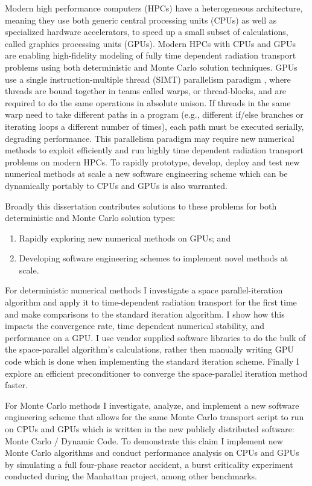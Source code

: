Modern high performance computers (HPCs) have a heterogeneous architecture, meaning they use both generic central processing units (CPUs) as well as specialized hardware accelerators, to speed up a small subset of calculations, called graphics processing units (GPUs).
Modern HPCs with CPUs and GPUs are enabling high-fidelity modeling of fully time dependent radiation transport problems using both deterministic and Monte Carlo solution techniques.
GPUs use a single instruction-multiple thread (SIMT) parallelism paradigm \cite{cuda}, where threads are bound together in teams called warps, or thread-blocks, and are required to do the same operations in absolute unison. 
If threads in the same warp need to take different paths in a program (e.g., different if/else branches or iterating loops a different number of times), each path must be executed serially, degrading performance.
This parallelism paradigm may require new numerical methods to exploit efficiently and run highly time dependent radiation transport problems on modern HPCs.
To rapidly prototype, develop, deploy and test new numerical methods at scale a new software engineering scheme which can be dynamically portably to CPUs and GPUs is also warranted.

Broadly this dissertation contributes solutions to these problems for both deterministic and Monte Carlo solution types:
\begin{enumerate}
    \item Rapidly exploring new numerical methods on GPUs; and
    \item Developing software engineering schemes to implement novel methods at scale.
\end{enumerate}

For deterministic numerical methods I investigate a space parallel-iteration algorithm and apply it to time-dependent radiation transport for the first time and make comparisons to the standard iteration algorithm.
I show how this impacts the convergence rate, time dependent numerical stability, and performance on a GPU.
I use vendor supplied software libraries to do the bulk of the space-parallel algorithm's calculations, rather then manually writing GPU code which is done when implementing the standard iteration scheme.
Finally I explore an efficient preconditioner to converge the space-parallel iteration method faster.

For Monte Carlo methods I investigate, analyze, and implement a new software engineering scheme that allows for the same Monte Carlo transport script to run on CPUs and GPUs which is written in the new publicly distributed software: Monte Carlo / Dynamic Code.
To demonstrate this claim I implement new Monte Carlo algorithms and conduct performance analysis on CPUs and GPUs by simulating a full four-phase reactor accident, a burst criticality experiment conducted during the Manhattan project, among other benchmarks.

